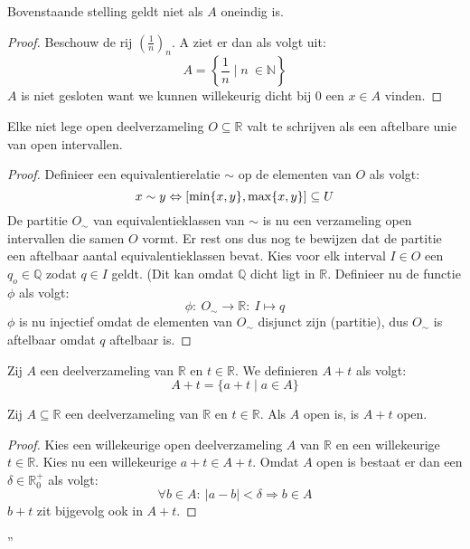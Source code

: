\documentclass[main.tex]{subfiles}
\begin{document}
\begin{tvb}
  Bovenstaande stelling geldt niet als $A$ oneindig is.

  \begin{proof}
    Beschouw de rij $\left(\frac{1}{n}\right)_{n}$.
    A ziet er dan als volgt uit:
    \[ A = \left\{ \frac{1}{n} \mid n\ \in \mathbb{N} \right\} \]
    $A$ is niet gesloten want we kunnen willekeurig dicht bij $0$ een $x\in A$ vinden.
  \end{proof}
\end{tvb}

\begin{bst}
  Elke niet lege open deelverzameling $O \subseteq \mathbb{R}$ valt te schrijven als een aftelbare unie van open intervallen.

  \begin{proof}
    Definieer een equivalentierelatie $\sim$ op de elementen van $O$ als volgt:
    \[ x \sim y \Leftrightarrow \interval{\min\{x,y\}}{\max\{x,y\}} \subseteq U \]
    De partitie $O_{\sim}$ van equivalentieklassen van $\sim$ is nu een verzameling open intervallen die samen $O$ vormt.
    Er rest ons dus nog te bewijzen dat de partitie een aftelbaar aantal equivalentieklassen bevat.
    Kies voor elk interval $I\in O$ een $q_{o}\in \mathbb{Q}$ zodat $q\in I$ geldt.
    (Dit kan omdat $\mathbb{Q}$ dicht ligt in $\mathbb{R}$.
    Definieer nu de functie $\phi$ als volgt:
    \[ \phi:\ O_{\sim} \rightarrow \mathbb{R}:\ I \mapsto q \]
    $\phi$ is nu injectief omdat de elementen van $O_{\sim}$ disjunct zijn (partitie), dus $O_{\sim}$ is aftelbaar omdat $q$ aftelbaar is.
  \end{proof}
\feed
\end{bst}


\begin{de}
  Zij $A$ een deelverzameling van $\mathbb{R}$ en $t\in \mathbb{R}$.
  We definieren $A+t$ als volgt:
  \[ A + t = \{ a + t \mid a \in A \} \]
\end{de}

\begin{st}
  Zij $A \subseteq \mathbb{R}$ een deelverzameling van $\mathbb{R}$ en $t\in \mathbb{R}$.
  Als $A$ open is, is $A+t$ open.

  \begin{proof}
    Kies een willekeurige open deelverzameling $A$ van $\mathbb{R}$ en een willekeurige $t\in \mathbb{R}$.
    Kies nu een willekeurige $a+t\in A+t$.
    Omdat $A$ open is bestaat er dan een $\delta \in \mathbb{R}_{0}^{+}$ als volgt:
    \[ \forall b \in A:\ |a-b| < \delta \Rightarrow b\in A \]
    $b+t$ zit bijgevolg ook in $A+t$.
  \end{proof}
\feed''
\end{st}
\end{document}
